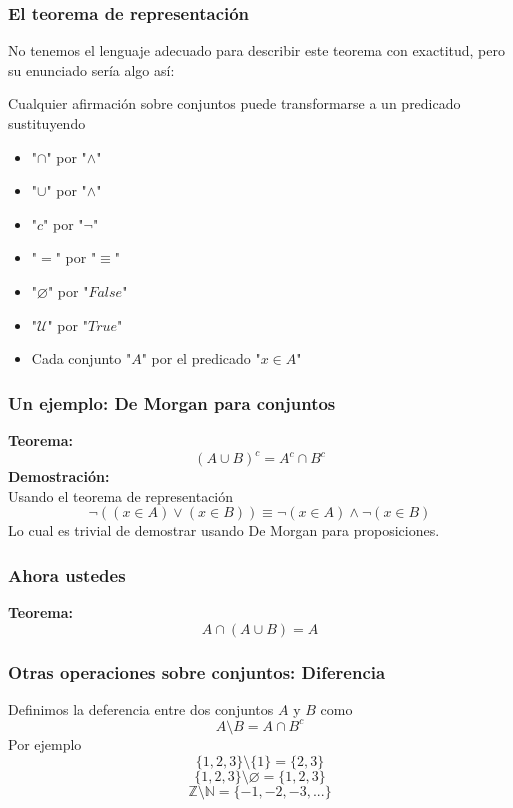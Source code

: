 \documentclass{beamer}
\begin{document}
\begin{frame}[fragile]
    \frametitle{El teorema de representación}
    \pause
    No tenemos el lenguaje adecuado para describir este teorema con exactitud,
    pero su enunciado sería algo así:
    \pause

    \begin{center}
        Cualquier afirmación sobre conjuntos puede transformarse a un predicado sustituyendo
    \pause
        \begin{itemize}
            \item "$\cap$" por "$\land$"
    \pause
            \item "$\cup$" por "$\land$"
    \pause
            \item "$c$" por "$\lnot$"
    \pause
            \item "$=$" por "$\equiv$"
    \pause
            \item "$\varnothing$" por "$False$"
    \pause
            \item "$\mathcal{U}$" por "$True$"
    \pause
            \item Cada conjunto "$A$" por el predicado "$x \in A$"
        \end{itemize}
    \end{center}
\end{frame}

\begin{frame}[fragile]
    \frametitle{Un ejemplo: De Morgan para conjuntos}
    \pause
    \textbf{Teorema:}
    $$(A \cup B)^c = A^c \cap B^c$$
    \pause
    \textbf{Demostración:} \\
    \pause
    Usando el teorema de representación
    \pause
    $$\lnot((x \in A) \lor (x \in B)) \equiv \lnot(x \in A) \land \lnot(x \in B)$$
    \pause
    Lo cual es trivial de demostrar usando De Morgan para proposiciones.
\end{frame}

\begin{frame}[fragile]
    \frametitle{Ahora ustedes}
    \pause
    \textbf{Teorema:}
    $$A \cap (A \cup B) = A$$
    \vspace{165pt}
\end{frame}

\begin{frame}[fragile]
    \frametitle{Otras operaciones sobre conjuntos: Diferencia}
    Definimos la deferencia entre dos conjuntos $A$ y $B$ como 
    $$ A \setminus B = A \cap B^{c}$$
    Por ejemplo
    $$ \{1, 2, 3\} \setminus \{1\} = \{2, 3\}$$
    $$ \{1, 2, 3\} \setminus \varnothing = \{1, 2, 3\}$$
    $$ \mathbb{Z} \setminus \mathbb{N} = \{-1, -2, -3, ...\}$$
\end{frame}
\end{document}

